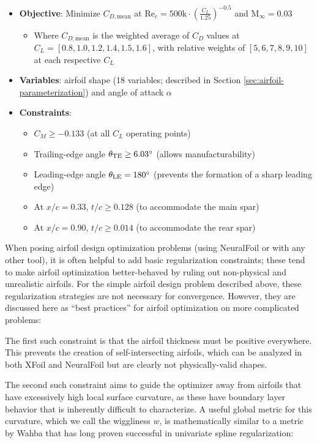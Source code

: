 \begin{itemize}
    \item \textbf{Objective}: Minimize $C_{D, \mathrm{mean}}$ at $\mathrm{Re}_c = 500\mathrm{k} \cdot \left(\frac{C_L}{1.25}\right)^{-0.5}$ and $\mathrm{M}_\infty = 0.03$
    \begin{itemize}
        \item Where $C_{D, \mathrm{mean}}$ is the weighted average of $C_D$ values at $C_L = [0.8, 1.0, 1.2, 1.4, 1.5, 1.6]$, with relative weights of $[5, 6, 7, 8, 9, 10]$ at each respective $C_L$
    \end{itemize}
    \item \textbf{Variables}: airfoil shape (18 variables; described in Section \ref{sec:airfoil-parameterization}) and angle of attack $\alpha$
    \item \textbf{Constraints}:
    \begin{itemize}
        \item $C_M \geq -0.133$ (at all $C_L$ operating points)
        \item Trailing-edge angle $\theta_{\rm TE} \geq 6.03^\circ$ (allows manufacturability)
        \item Leading-edge angle $\theta_{\rm LE} = 180^\circ$ (prevents the formation of a sharp leading edge)
        \item At $x/c = 0.33$, $t/c \geq 0.128$ (to accommodate the main spar)
        \item At $x/c = 0.90$, $t/c \geq 0.014$ (to accommodate the rear spar)
    \end{itemize}
\end{itemize}

When posing airfoil design optimization problems (using NeuralFoil or with any other tool), it is often helpful to add basic regularization constraints; these tend to make airfoil optimization better-behaved by ruling out non-physical and unrealistic airfoils. For the simple airfoil design problem described above, these regularization strategies are not necessary for convergence. However, they are discussed here as ``best practices'' for airfoil optimization on more complicated problems:

The first such constraint is that the airfoil thickness must be positive everywhere. This prevents the creation of self-intersecting airfoils, which can be analyzed in both XFoil and NeuralFoil but are clearly not physically-valid shapes.

The second such constraint aims to guide the optimizer away from airfoils that have excessively high local surface curvature, as these have boundary layer behavior that is inherently difficult to characterize. A useful global metric for this curvature, which we call the wiggliness $w$, is mathematically similar to a metric by Wahba \cite{wahba_spline_2007} that has long proven successful in univariate spline regularization:

